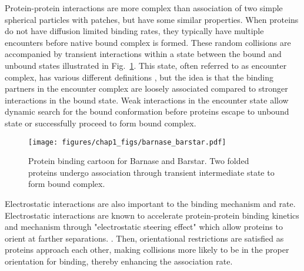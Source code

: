 \documentclass[../talant.diss.submit.tex]{subfiles}
\begin{document}
Protein-protein interactions are more complex than association of two simple
spherical particles with patches, but have some similar properties.  When
proteins do not have diffusion limited binding rates, they typically have
multiple encounters before native bound complex is formed.  These random collisions are
accompanied by transient interactions within a state between the bound and
unbound states illustrated in Fig.~\ref{fig:barnase_barstar}.  This state, often
referred to as encounter complex, has various different definitions
\cite{gabdoulline:99p}, but the idea is that the binding partners in the
encounter complex are loosely associated compared to stronger interactions in
the bound state.  Weak interactions in the encounter state allow dynamic search
for the bound conformation before proteins escape to unbound state or successfully
proceed to form bound complex.
%
%
\begin{figure}[htp!]
  \begin{centering}
    \texttt{[image: figures/chap1\_figs/barnase\_barstar.pdf]}
    \caption{Protein binding cartoon for Barnase and Barstar. Two folded proteins undergo
      association through transient intermediate state to form bound complex.}
    \label{fig:barnase_barstar}
  \end{centering}
\end{figure}
%
%
Electrostatic interactions are also important to the binding mechanism and rate.
Electrostatic interactions are known to accelerate protein-protein binding
kinetics and mechanism through "electrostatic steering effect"
which allow proteins to orient at farther
separations.
\cite{wade:98e,brock:07o,mohan:16e,tan:93,antosiewicz:96,huangsteering:15}.
Then, orientational restrictions
are satisfied as proteins approach each other, making collisions more likely to be in the proper orientation for binding, thereby enhancing the association rate.
\end{document}
